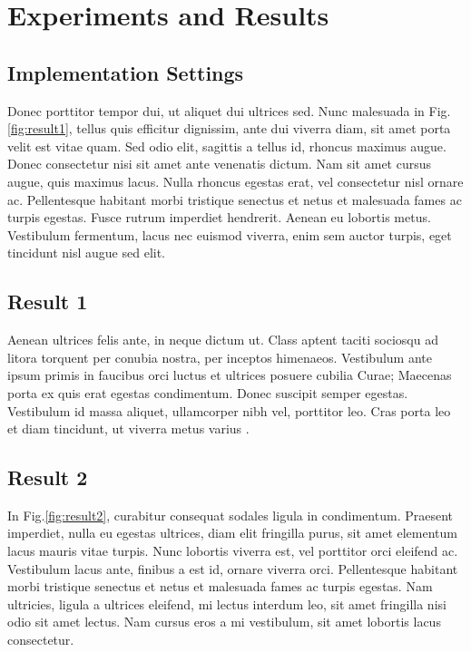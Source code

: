 \chapter{Experiments and Results}\label{cpt:exp}

\section{Implementation Settings}

Donec porttitor tempor dui, ut aliquet dui ultrices sed. Nunc malesuada in Fig.\ref{fig:result1}, tellus quis efficitur dignissim, ante dui viverra diam, sit amet porta velit est vitae quam. Sed odio elit, sagittis a tellus id, rhoncus maximus augue. Donec consectetur nisi sit amet ante venenatis dictum. Nam sit amet cursus augue, quis maximus lacus. Nulla rhoncus egestas erat, vel consectetur nisl ornare ac. Pellentesque habitant morbi tristique senectus et netus et malesuada fames ac turpis egestas. Fusce rutrum imperdiet hendrerit. Aenean eu lobortis metus. Vestibulum fermentum, lacus nec euismod viverra, enim sem auctor turpis, eget tincidunt nisl augue sed elit.


\section{Result 1}

Aenean ultrices felis ante, in neque dictum ut. Class aptent taciti sociosqu ad litora torquent per conubia nostra, per inceptos himenaeos. Vestibulum ante ipsum primis in faucibus orci luctus et ultrices posuere cubilia Curae; Maecenas porta ex quis erat egestas condimentum. Donec suscipit semper egestas. Vestibulum id massa aliquet, ullamcorper nibh vel, porttitor leo. Cras porta leo et diam tincidunt, ut viverra metus varius .


\section{Result 2}

In Fig.\ref{fig:result2}, curabitur consequat sodales ligula in condimentum. Praesent imperdiet, nulla eu egestas ultrices, diam elit fringilla purus, sit amet elementum lacus mauris vitae turpis. Nunc lobortis viverra est, vel porttitor orci eleifend ac. Vestibulum lacus ante, finibus a est id, ornare viverra orci. Pellentesque habitant morbi tristique senectus et netus et malesuada fames ac turpis egestas. Nam ultricies, ligula a ultrices eleifend, mi lectus interdum leo, sit amet fringilla nisi odio sit amet lectus. Nam cursus eros a mi vestibulum, sit amet lobortis lacus consectetur.



